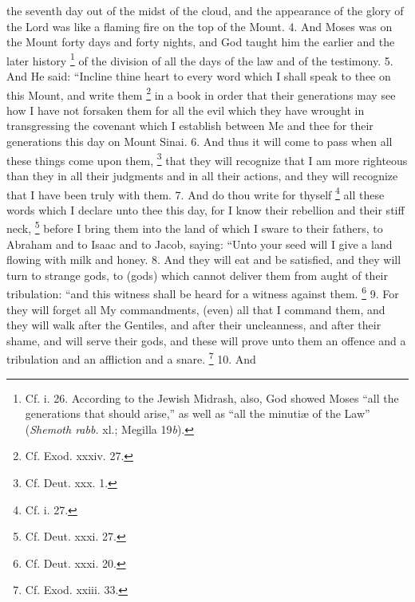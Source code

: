 the seventh day out of the midst of the cloud, and the appearance of the glory of the Lord was like a flaming fire on the top of the Mount. 4. And Moses was on the Mount forty days and forty nights, and God taught him the earlier and the later history \footnote{Cf. i. 26. According to the Jewish Midrash, also, God showed Moses ``all the generations that should arise,'' as well as ``all the minutiæ of the Law'' (\emph{Shemoth rabb.} xl.; Megilla 19\emph{b}).} of the division of all the days of the law and of the testimony. 5. And He said: ``Incline thine heart to every word which I shall speak to thee on this Mount, and write them \footnote{Cf. Exod. xxxiv. 27.} in a book in order that their generations may see how I have not forsaken them for all the evil which they have wrought in transgressing the covenant which I establish between Me and thee for their generations this day on Mount Sinai. 6. And thus it will come to pass when all these things come upon them, \footnote{Cf. Deut. xxx. 1.} that they will recognize that I am more righteous than they in all their judgments and in all their actions, and they will recognize that I have been truly with them. 7. And do thou write for thyself \footnote{Cf. i. 27.} all these words which I declare unto thee this day, for I know their rebellion and their stiff neck, \footnote{Cf. Deut. xxxi. 27.} before I bring them into the land of which I sware to their fathers, to Abraham and to Isaac and to Jacob, saying: ``Unto your seed will I give a land flowing with milk and honey. 8. And they will eat and be satisfied, and they will turn to strange gods, to (gods) which cannot deliver them from aught of their tribulation: ``and this witness shall be heard for a witness against them. \footnote{Cf. Deut. xxxi. 20.} 9. For they will forget all My commandments, (even) all that I command them, and they will walk after the Gentiles, and after their uncleanness, and after their shame, and will serve their gods, and these will prove unto them an offence and a tribulation and an affliction and a snare. \footnote{Cf. Exod. xxiii. 33.} 10. And

